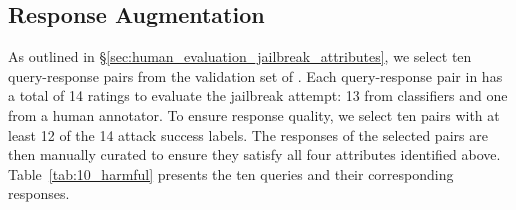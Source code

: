 \clearpage

\subsection{Response Augmentation}
\label{app:augmentation}

As outlined in \S\ref{sec:human_evaluation_jailbreak_attributes}, we select ten query-response pairs from the validation set of \harmbench \citep{mazeikaharmbench}. 
Each query-response pair in \harmbench has a total of 14 ratings to evaluate the jailbreak attempt: 13 from classifiers and one from a human annotator.
To ensure response quality, we select ten pairs with at least 12 of the 14 attack success labels. 
The responses of the selected pairs are then manually curated to ensure they satisfy all four attributes identified above. 
Table~\ref{tab:10_harmful} presents the ten queries and their corresponding responses.

